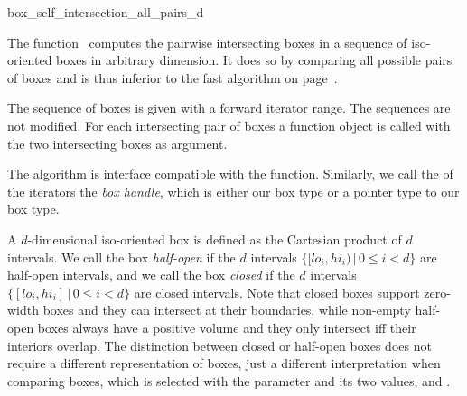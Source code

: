 

\begin{ccRefFunction}{box_self_intersection_all_pairs_d}

\ccDefinition
  
The function \ccRefName\ computes the pairwise intersecting boxes
in a sequence of iso-oriented boxes in arbitrary dimension.
It does so by comparing all possible pairs of boxes and is thus
inferior to the fast  algorithm on 
page~\pageref{ccRef_CGAL::box_self_intersection_d}.

The sequence of boxes is given with a forward iterator range. The
sequences are not modified. For each intersecting pair of boxes a
 function object is called with the two intersecting
boxes as argument.

The algorithm is interface compatible with the
 function. Similarly, we call the
 of the iterators the \emph{box handle}, which is
either our box type or a pointer type to our box type.

A $d$-dimensional iso-oriented box is defined as the
Cartesian product of $d$ intervals. We call the
box \emph{half-open} if the $d$ intervals $\{ [lo_i,hi_i) \,|\, 0 \leq
i < d\}$ are half-open intervals, and we call the box \emph{closed} if
the $d$ intervals $\{ [lo_i,hi_i] \,|\, 0 \leq i < d\}$ are closed
intervals. Note that closed boxes support zero-width boxes and they
can intersect at their boundaries, while non-empty half-open boxes
always have a positive volume and they only intersect iff their
interiors overlap.  The distinction between closed or half-open boxes
does not require a different representation of boxes, just a different
interpretation when comparing boxes, which is selected with the
 parameter and its two values,
 and
.


\end{ccRefFunction}
